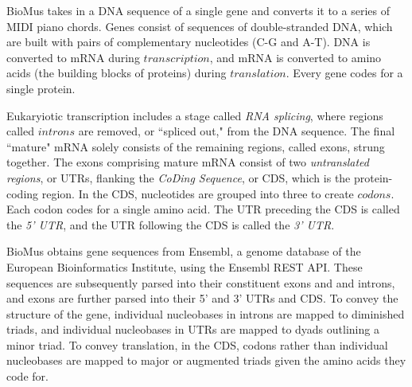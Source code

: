 \documentclass[letterpaper]{article}
\begin{document}
BioMus takes in a DNA sequence of a single gene and converts it to a series of MIDI piano chords. Genes consist of sequences of double-stranded DNA, 
which are built with pairs of complementary nucleotides (C-G and A-T). 
DNA is converted to mRNA during $transcription$, and mRNA is converted to amino acids (the building blocks of proteins) during $translation$. Every gene codes for a single protein. 

Eukaryiotic transcription includes a stage called \textit{RNA splicing}, where regions called $introns$ are removed, or ``spliced out," from the DNA sequence. The final ``mature" mRNA solely consists of the remaining regions, called exons, strung together. The exons comprising mature mRNA consist of two \textit{untranslated regions}, or UTRs, flanking the \textit{CoDing Sequence}, or CDS, which is the protein-coding region. 
In the CDS, nucleotides are grouped into three to create $codons$. Each codon codes for a single amino acid. The UTR preceding the CDS is called the \textit{5' UTR}, and the UTR following the CDS is called the \textit{3' UTR}.

BioMus obtains gene sequences from Ensembl, a genome database of the European Bioinformatics Institute, using the Ensembl REST API. These sequences are subsequently parsed into their constituent exons and and introns, and exons are further parsed into their 5' and 3' UTRs and CDS. To convey the structure of the gene, individual nucleobases in introns are mapped to diminished triads, and individual nucleobases in UTRs are mapped to dyads outlining a minor triad. To convey translation, in the CDS, codons rather than individual nucleobases are mapped to major or augmented triads given the amino acids they code for. 
\end{document}
